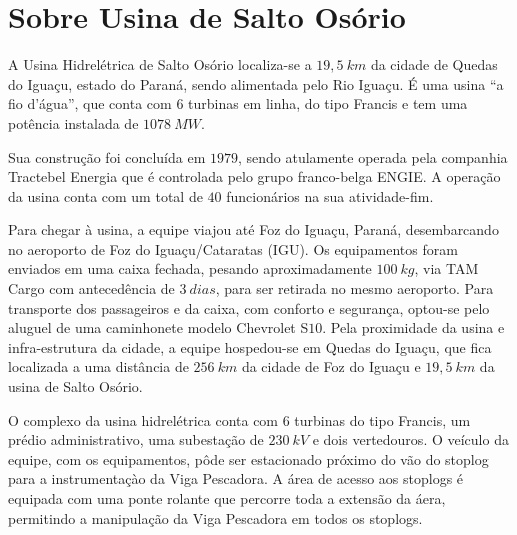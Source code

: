 \section{Sobre Usina de Salto Osório}

A Usina Hidrelétrica de Salto Osório localiza-se a $19,5~km$ da cidade de Quedas
do Iguaçu, estado do Paraná, sendo alimentada pelo Rio Iguaçu. É uma usina ``a
fio d'água'', que conta com $6$ turbinas em linha, do tipo Francis e tem uma potência
instalada de $1078~MW$.

Sua construção foi concluída em $1979$, sendo atulamente operada pela companhia
Tractebel Energia que é controlada pelo grupo franco-belga ENGIE. A operação da
usina conta com um total de $40$ funcionários na sua atividade-fim.



Para chegar à usina, a equipe viajou até Foz do Iguaçu, Paraná, desembarcando no
aeroporto de Foz do Iguaçu/Cataratas (IGU). Os equipamentos foram enviados em
uma caixa fechada, pesando aproximadamente $100~kg$, via TAM Cargo com
antecedência de $3~dias$, para ser retirada no mesmo aeroporto. Para transporte
dos passageiros e da caixa, com conforto e segurança, optou-se pelo aluguel de
uma caminhonete modelo Chevrolet S$10$. Pela proximidade da usina e
infra-estrutura da cidade, a equipe hospedou-se em Quedas do Iguaçu,
que fica localizada a uma distância de $256~km$ da cidade de Foz do Iguaçu e
$19,5~km$ da usina de Salto Osório.

O complexo da usina hidrelétrica conta com $6$ turbinas do tipo Francis, um
prédio administrativo, uma subestação de $230~kV$ e dois vertedouros. O veículo
da equipe, com os equipamentos, pôde ser estacionado próximo do vão do stoplog
para a instrumentaçào da Viga Pescadora. A área de acesso aos stoplogs é
equipada com uma ponte rolante que percorre toda a extensão da áera, permitindo
a manipulação da Viga Pescadora em todos os stoplogs. 

